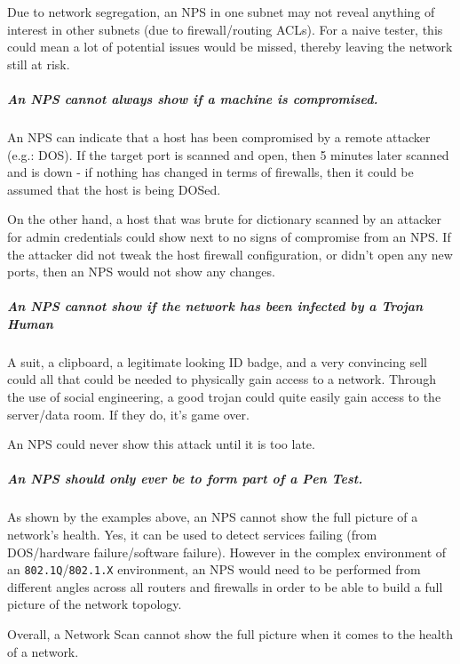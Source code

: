 \documentclass[a4paper]{article}
\begin{document}
Due to network segregation, an NPS in one subnet may not reveal anything of interest in other subnets (due to firewall/routing ACLs).
For a naive tester, this could mean a lot of potential issues would be missed, thereby leaving the network still at risk.

\subparagraph{An NPS cannot always show if a machine is compromised.}
An NPS can indicate that a host has been compromised by a remote attacker (e.g.: DOS).
If the target port is scanned and open, then 5 minutes later scanned and is down - if nothing has changed in terms of firewalls, then it could be assumed that the host is being DOSed.

On the other hand, a host that was brute for dictionary scanned by an attacker for admin credentials could show next to no signs of compromise from an NPS.
If the attacker did not tweak the host firewall configuration, or didn't open any new ports, then an NPS would not show any changes.

\subparagraph{An NPS cannot show if the network has been infected by a Trojan Human}
A suit, a clipboard, a legitimate looking ID badge, and a very convincing sell could all that could be needed to physically gain access to a network.
Through the use of social engineering, a good trojan could quite easily gain access to the server/data room.
If they do, it's game over.

An NPS could never show this attack until it is too late.


\subparagraph{An NPS should only ever be to form part of a Pen Test.}
As shown by the examples above, an NPS cannot show the full picture of a network's health.
Yes, it can be used to detect services failing (from DOS/hardware failure/software failure).
However in the complex environment of an \texttt{802.1Q}/\texttt{802.1.X} environment, an NPS would need to be performed from different angles across all routers and firewalls in order to be able to build a full picture of the network topology.

Overall, a Network Scan cannot show the full picture when it comes to the health of a network.
\end{document}
